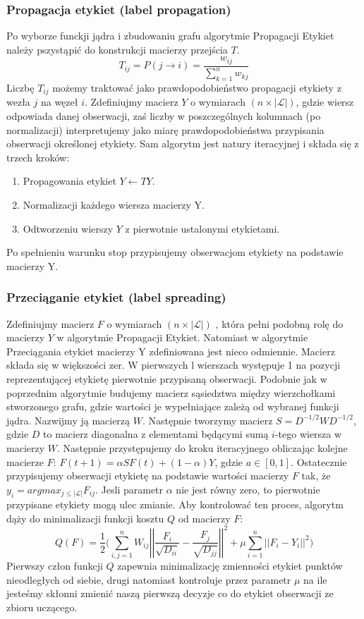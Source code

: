 \documentclass{article}
\begin{document}
\subsubsection{Propagacja etykiet (label propagation)}
Po wyborze funckji jądra i zbudowaniu grafu algorytmie Propagacji Etykiet należy pszystąpić do konstrukcji macierzy przejścia \(T\).
\[T_{ij} = P(j \rightarrow i) = \frac{w_{ij}}{\sum^n_{k=1}w_{kj}}\]
Liczbę \(T_{ij}\) możemy traktować jako prawdopodobieństwo propagacji etykiety z wezła \(j\) na węzeł \(i\). Zdefiniujmy macierz \(Y\) o wymiarach \((n \times |\mathcal{L}|)\), gdzie wiersz odpowiada danej obserwacji, zaś liczby w poszczególnych kolumnach (po normalizacji) interpretujemy jako miarę prawdopodobieństwa przypisania obserwacji określonej etykiety.
Sam algorytm jest natury iteracyjnej i składa się z trzech kroków:
\begin{enumerate}
	\item Propagowania etykiet \(Y \leftarrow TY\).
	\item Normalizacji każdego wiersza macierzy Y.
	\item Odtworzeniu wierszy \(Y\) z pierwotnie ustalonymi etykietami.
\end{enumerate}
Po spełnieniu warunku stop przypisujemy obserwacjom etykiety na podstawie macierzy Y\cite{Zhu2002}.
\subsubsection{Przeciąganie etykiet (label spreading)}
Zdefiniujmy macierz \(F\) o wymiarach \((n \times |\mathcal{L}|)\) , która pełni podobną rolę do macierzy \(Y\) w algorytmie Propagacji Etykiet.
Natomiast w algorytmie Przeciągania etykiet macierzy Y zdefiniowana jest nieco odmiennie.
Macierz składa się w większości zer. W pierwszych l wierszach występuje 1 na pozycji reprezentującej etykietę pierwotnie przypisaną obserwacji.
Podobnie jak w poprzednim algorytmie budujemy macierz sąsiedztwa między wierzchołkami stworzonego grafu, gdzie wartości je wypełniające zależą od wybranej funkcji jądra.
Nazwijmy ją macierzą \(W\). 
Następnie tworzymy macierz \(S = D^{-1/2}WD^{-1/2}\), gdzie \(D\) to macierz diagonalna z elementami będącymi sumą \(i\)-tego wiersza w macierzy \(W\).
Następnie przystępujemy do kroku iteracyjnego obliczając kolejne macierze \(F\): \(F(t+1) = \alpha SF(t) + (1 - \alpha)Y\), gdzie \(a \in [0,1]\).
Ostatecznie przypisujemy obserwacji etykietę na podstawie wartości macierzy \(F\) tak, że \(y_i = argmax_{j\leqslant |\mathcal{L}|} F_{ij}\).
Jesli parametr \(\alpha\) nie jest równy zero, to pierwotnie przypisane etykiety mogą ulec zmianie.
Aby kontrolować ten proces, algorytm dąży do minimalizacji funkcji kosztu \(Q\) od macierzy \(F\):
\[Q(F) = \frac{1}{2}\bigg(\sum\limits^n_{i,j=1}W_{ij}\left|\left| \frac{F_i}{\sqrt{D_{ii}}} -
\frac{F_j}{\sqrt{D_{jj}}}\right|\right|^2 + \mu\sum\limits^n_{i=1}
\left|\left|F_i - Y_i\right|\right|^2 \bigg)\]
Pierwszy człon funkcji \(Q\) zapewnia minimalizację zmienności etykiet punktów nieodległych od siebie, drugi natomiast kontroluje przez parametr \(\mu\) na ile jesteśmy skłonni zmienić naszą pierwszą decyzje co do etykiet obserwacji ze zbioru uczącego\citep{Zhou2004}.	
\end{document}
